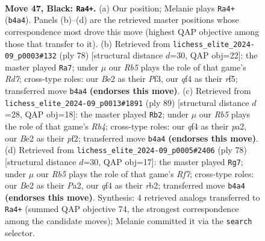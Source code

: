 \documentclass[11pt]{article}
\begin{document}
\clearpage

\begin{figure}[p]\centering
\begin{subfigure}{0.46\textwidth}\centering
\resizebox{\linewidth}{!}{%
\newchessgame
\chessboard[
  setfen={4k3/1p1R4/8/8/1r2PQ2/8/4b1PP/K7 b - - 0 47},
  showmover=false,
  pgfstyle=straightmove, color=movearrow, markmove={b4-a4}
]}
\caption{}
\end{subfigure}\hfill
\begin{subfigure}{0.46\textwidth}\centering
\resizebox{\linewidth}{!}{%
\newchessgame
\chessboard[
  setfen={8/3R2pk/p7/5r1p/8/5P2/6K1/8 w - - 0 40},
  showmover=false,
  pgfstyle=straightmove, color=movearrow, markmove={d7-a7}
]}
\caption{}
\end{subfigure}
\\[4pt]
\begin{subfigure}{0.46\textwidth}\centering
\resizebox{\linewidth}{!}{%
\newchessgame
\chessboard[
  setfen={8/8/8/pr3PK1/R7/3k4/P4P2/8 b - - 2 45},
  showmover=false,
  pgfstyle=straightmove, color=movearrow, markmove={b5-b2}
]}
\caption{}
\end{subfigure}\hfill
\begin{subfigure}{0.46\textwidth}\centering
\resizebox{\linewidth}{!}{%
\newchessgame
\chessboard[
  setfen={2B5/kp3R2/2p3p1/p7/8/5KP1/Pr6/8 w - - 0 40},
  showmover=false,
  pgfstyle=straightmove, color=movearrow, markmove={f7-g7}
]}
\caption{}
\end{subfigure}
\caption{\textbf{Move 47, Black: \texttt{Ra4+}.} (a) Our position; Melanie plays \texttt{Ra4+} (\texttt{b4a4}). Panels (b)--(d) are the retrieved master positions whose correspondence most drove this move (highest QAP objective among those that transfer to it). (b) Retrieved from \texttt{lichess\_elite\_2024-09\_p0003\#132} (ply 78) [structural distance $d$=30, QAP obj=22]: the master played \texttt{Ra7}; under $\mu$ our \emph{Rb5} plays the role of that game's \emph{Rd7}; cross-type roles: our \emph{B}e2 as their \emph{P}f3, our \emph{q}f4 as their \emph{r}f5; transferred move \texttt{b4a4} \textbf{(endorses this move)}. (c) Retrieved from \texttt{lichess\_elite\_2024-09\_p0013\#1891} (ply 89) [structural distance $d$=28, QAP obj=18]: the master played \texttt{Rb2}; under $\mu$ our \emph{Rb5} plays the role of that game's \emph{Rb4}; cross-type roles: our \emph{q}f4 as their \emph{p}a2, our \emph{B}e2 as their \emph{p}f2; transferred move \texttt{b4a4} \textbf{(endorses this move)}. (d) Retrieved from \texttt{lichess\_elite\_2024-09\_p0005\#2406} (ply 78) [structural distance $d$=30, QAP obj=17]: the master played \texttt{Rg7}; under $\mu$ our \emph{Rb5} plays the role of that game's \emph{Rf7}; cross-type roles: our \emph{B}e2 as their \emph{P}a2, our \emph{q}f4 as their \emph{r}b2; transferred move \texttt{b4a4} \textbf{(endorses this move)}. Synthesis: 4 retrieved analogs transferred to \texttt{Ra4+} (summed QAP objective 74, the strongest correspondence among the candidate moves); Melanie committed it via the \texttt{search} selector.}
\label{fig:thought-m93}
\end{figure}
\end{document}
